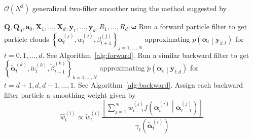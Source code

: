 \documentclass[notitlepage]{article}
\newcommand\StateXX{\Statex\hspace{\algorithmicindent}\hspace{\algorithmicindent}}
\renewcommand{\vec}[1]{\bm{#1}}
\newcommand{\mat}[1]{\mathbf{#1}}
\newcommand{\Lbrac}[1]{\left[ #1\right]}
\newcommand{\Lbrace}[1]{\left\{ #1\right\}}
\newcommand{\Lparen}[1]{\left( #1\right)}
\newcommand{\Cond}[2]{ #1 \middle\vert  #2}
\newcommand{\optor}[2]{#1\Lparen{#2}}
\newcommand{\optorC}[3]{\optor{#1}{\Cond{#2}{#3}}}
\newcommand{\pdensC}[2]{\optorC{p}{#1}{#2}}
\newcommand{\pdenstC}[2]{\optorC{\widetilde p}{#1}{#2}}
\newcommand{\partic}[3]{#1_{#2}^{\Lparen{#3}}}
\newcommand{\particB}[3]{\widetilde{#1}_{#2}^{\Lparen{#3}}}
\newcommand{\particS}[3]{\widehat{#1}_{#2}^{\Lparen{#3}}}
\newcommand{\bigO}[1]{\mathcal{O}\Lparen{#1}}
\newcommand{\nPart}{N}
\newcommand{\nPeriods}{d}
\begin{document}
\begin{algorithm}[H]
\caption{$\bigO{\nPart^2}$ generalized two-filter smoother using the method
suggested by \citet{briers09}.}\label{alg:ON2smoother}
\begin{algorithmic}[1]\raggedright
\INPUT
\Statex $\mat{Q},\mat{Q}_0,\vec{a}_0,\mat{X}_1,\dots,\mat{X}_d,\vec{y}_1,\dots,\vec{y}_d,R_1,\dots,R_d,\vec{\omega}$
%
\State Run a forward particle filter to get particle clouds %
	$\Lbrace{\partic{\vec{\alpha}}{t}{j}, \partic{w}{t}{j}, \partic{\beta}{t + 1}{j}}_{j=1,\dots,N}$ %
	approximating $\pdensC{\vec{\alpha}_t}{\vec{y}_{1:t}}$ for $t = 0, 1, \dots, \nPeriods$. See Algorithm~\ref{alg:forward}.
\EndProcedure
%
\State Run a similar backward filter to get %
	$\Lbrace{\particB{\vec{\alpha}}{t}{k}, \particB{w}{t}{k}, \particB{\beta}{t - 1}{k}}_{k=1,\dots,N}$  %
	approximating $\pdenstC{\vec{\alpha}_t}{\vec{y}_{t:\nPeriods}}$ for $t = \nPeriods + 1, \nPeriods, \nPeriods-1, \dots, 1$. See Algorithm~\ref{alg:backward}.
\EndProcedure
%
\For{$t=1,\dots, \nPeriods$}
\State Assign each backward filter particle a smoothing weight given by
\StateXX \begin{equation}\label{eqn:combineWeightO2}
\particS{w}{t}{i} \propto
	\particB{w}{t}{i} \frac{\Lbrac{
		\sum_{j = 1}^\nPart \partic{w}{t - 1}{j}
		\optorC{f}{\particB{\vec{\alpha}}{t}{i}}{\partic{\vec{\alpha}}{t - 1}{j}}
	}}{ \optor{\gamma_t}{\particB{\vec{\alpha}}{t}{i}}}
\end{equation}
\EndFor
\EndProcedure
\end{algorithmic}
\end{algorithm}
\end{document}
